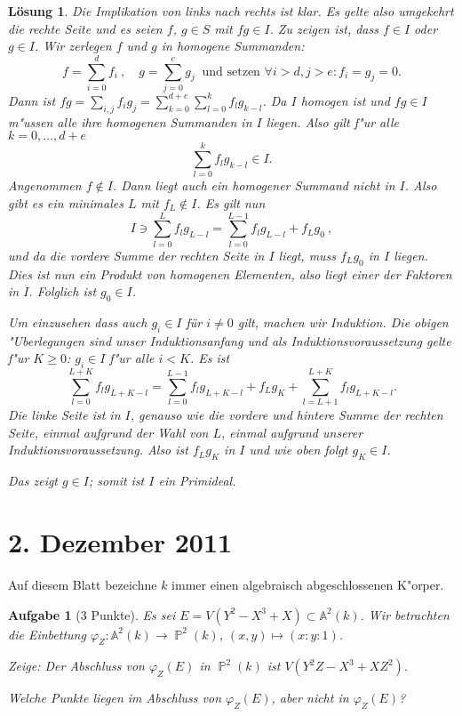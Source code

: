 \documentclass[a4paper, 12pt, numbers=noendperiod, chapterprefix=true]{scrbook}
\theoremstyle{break}
\newtheorem{Aufg}{Aufgabe}
\newtheorem{Loes}{L\"osung}
\theoremstyle{nonumberbreak}
\theoremstyle{nonumberplain}
\newcommand{\A}{\mathbb{A}}
\newcommand{\Affine}{\mathbb{A}} %
\DeclareMathOperator{\Projective}{\mathbb{P}} %
\begin{document}
\begin{Loes}
Die Implikation von links nach rechts ist klar. Es gelte also umgekehrt die rechte Seite und es seien $f$, $g\in S$ mit $fg\in I$. Zu zeigen ist, dass $f\in I$ oder $g\in I$. Wir zerlegen $f$ und $g$ in homogene Summanden:
	\[f= \sum_{i=0}^d f_i\ ,\quad g= \sum_{j=0}^e g_j\ \textrm{ und setzen } \forall i > d,j > e: f_i=g_j=0 .\]
Dann ist $fg = \sum_{i,j} f_ig_j = \sum_{k=0}^{d+e} \sum_{l=0}^k f_lg_{k-l}$. Da $I$ homogen ist und $fg\in I$ m"ussen alle ihre homogenen Summanden in $I$ liegen. Also gilt f"ur alle $k=0,\dots,d+e$
	\[\sum_{l=0}^k f_lg_{k-l} \in I.\]
Angenommen $f\not\in I$. Dann liegt auch ein homogener Summand nicht in $I$. Also gibt es ein minimales $L$ mit $f_L \not\in I$. Es gilt nun
	\[I\ni \sum_{l=0}^L f_lg_{L-l} = \sum_{l=0}^{L-1}f_lg_{L-l} + f_Lg_0\ ,\]
und da die vordere Summe der rechten Seite in $I$ liegt, muss $f_Lg_0$ in $I$ liegen. Dies ist nun ein Produkt von homogenen Elementen, also liegt einer der Faktoren in $I$. Folglich ist $g_0\in I$.

Um einzusehen dass auch $g_i\in I$ für $i\neq 0$ gilt, machen wir Induktion. Die obigen "Uberlegungen sind unser Induktionsanfang und als Induktionsvoraussetzung gelte f"ur $K\geq 0$: $g_i\in I$ f"ur alle $i< K$. Es ist
	\[\sum_{l=0}^{L+K} f_lg_{L+K-l} = \sum_{l=0}^{L-1}f_lg_{L+K-l} + f_Lg_K + \sum_{l=L+1}^{L+K}f_lg_{L+K-l}.\]
Die linke Seite ist in $I$, genauso wie die vordere und hintere Summe der rechten Seite, einmal aufgrund der Wahl von $L$, einmal aufgrund unserer Induktionsvoraussetzung. Also ist $f_Lg_K$ in $I$ und wie oben folgt $g_K\in I$.

Das zeigt $g\in I$; somit ist $I$ ein Primideal.
\end{Loes}

\newpage
\section{2. Dezember 2011}
\setcounter{Aufg}{0}
\setcounter{Loes}{3}

Auf diesem Blatt bezeichne $k$ immer einen algebraisch abgeschlossenen K"orper.

\begin{Aufg}[3 Punkte]
Es sei $E = V(Y^2 - X^3 + X)\subset \Affine^2(k)$. Wir betrachten die Einbettung $\varphi_Z: \Affine^2(k)\to \Projective^2(k)$, $(x,y)\mapsto (x:y:1)$.

Zeige: Der Abschluss von $\varphi_Z(E)$ in $\Projective^2(k)$ ist $V(Y^2Z - X^3 + XZ^2)$.

Welche Punkte liegen im Abschluss von $\varphi_Z(E)$, aber nicht in $\varphi_Z(E)$?
\end{Aufg}
\end{document}
